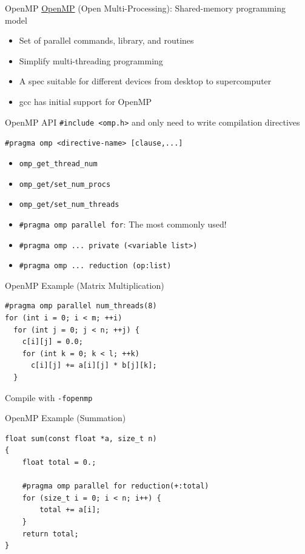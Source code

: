\documentclass{../TexTemplate/myslide}
\begin{document}
\begin{frame}{OpenMP}
\href{https://www.openmp.org/}{OpenMP} (Open Multi-Processing): Shared-memory programming model
\begin{itemize}
	\item Set of parallel commands, library, and routines
	\item Simplify multi-threading programming
	\item A spec suitable for different devices from desktop to supercomputer
	\item gcc has initial support for OpenMP
\end{itemize}
\end{frame}

\begin{frame}[fragile]{OpenMP API}
\verb'#include <omp.h>' and only need to write compilation directives
\begin{center}
\verb'#pragma omp <directive-name> [clause,...]'
\end{center}
\begin{itemize}
	\item \verb'omp_get_thread_num'
	\item \verb'omp_get/set_num_procs'
	\item \verb'omp_get/set_num_threads'
	\item \verb'#pragma omp parallel for': The most commonly used!
	\item \verb'#pragma omp ... private (<variable list>)'
	\item \verb'#pragma omp ... reduction (op:list)'
\end{itemize}
\end{frame}

\begin{frame}[fragile]{OpenMP Example (Matrix Multiplication)}
\begin{lstlisting}
#pragma omp parallel num_threads(8)
for (int i = 0; i < m; ++i)
  for (int j = 0; j < n; ++j) {
    c[i][j] = 0.0;
    for (int k = 0; k < l; ++k)
      c[i][j] += a[i][j] * b[j][k];
  }
\end{lstlisting}
Compile with \verb'-fopenmp'
\end{frame}

\begin{frame}[fragile]{OpenMP Example (Summation)}
\begin{lstlisting}
float sum(const float *a, size_t n)
{
    float total = 0.;

    #pragma omp parallel for reduction(+:total)
    for (size_t i = 0; i < n; i++) {
        total += a[i];
    }
    return total;
}
\end{lstlisting}
\end{frame}
\end{document}
